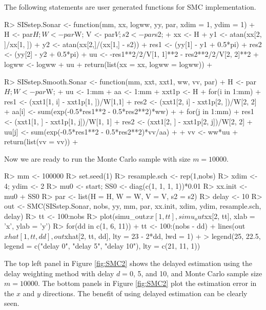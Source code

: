 The following statements are user generated functions for SMC implementation.
\begin{example}
R> SISstep.Sonar <- function(mm, xx, logww, yy, par, xdim = 1, ydim = 1){
+    H <- par$H; W <- par$W; V <- par$V; s2 <- par$s2;
+    xx <- H%
+    y1 <- atan(xx[2, ]/xx[1, ])
+    y2 <- atan(xx[2,]/(xx[1,] - s2))   
+    res1 <- (yy[1] - y1 + 0.5*pi)%
+    res2 <- (yy[2] - y2 + 0.5*pi)%
+    uu <- -res1**2/2/V[1, 1]**2 - res2**2/2/V[2, 2]**2
+    logww <- logww + uu
+    return(list(xx = xx, logww = logww))
+  }

R> SISstep.Smooth.Sonar <- function(mm, xxt, xxt1, ww, vv, par){
+    H <- par$H; W <- par$W;
+    uu <- 1:mm
+    aa <- 1:mm
+    xxt1p <- H%
+    for(i in 1:mm){
+      res1 <- (xxt1[1, i] - xxt1p[1, ])/W[1,1]
+      res2 <- (xxt1[2, i] - xxt1p[2, ])/W[2, 2]
+      aa[i] <- sum(exp(-0.5*res1**2 - 0.5*res2**2)*ww)
+    }
+    for(j in 1:mm){
+      res1 <- (xxt1[1, ] - xxt1p[1, j])/W[1, 1]
+      res2 <- (xxt1[2, ] - xxt1p[2, j])/W[2, 2]
+      uu[j] <- sum(exp(-0.5*res1**2 - 0.5*res2**2)*vv/aa)
+    }
+    vv <- ww*uu
+    return(list(vv = vv))
+ }
\end{example}

Now we are ready to run the Monte Carlo sample with size $m=10000$. 
\begin{example}
R> mm <- 100000
R> set.seed(1)
R> resample.sch <- rep(1,nobs)
R> xdim <- 4; ydim <- 2
R> mu0 <- start; SS0 <- diag(c(1, 1, 1, 1))*0.01
R> xx.init <- mu0 + SS0%
R> par <- list(H = H, W = W, V = V, s2 = s2)
R> delay <- 10
R> out <- SMC(SISstep.Sonar, nobs, yy, mm, par, xx.init, xdim, ydim, resample.sch, delay)
R> tt <- 100:nobs
R> plot(simu_out$xx[1, tt], simu_out$xx[2, tt], xlab = 'x', ylab = 'y')
R> for(dd in c(1, 6, 11)){
+      tt <- 100:(nobs - dd)
+      lines(out$xhat[1, tt, dd], out$xhat[2, tt, dd], lty = 23 - 2*dd, lwd = 1)
+    }
> legend(25, 22.5, legend = c("delay 0", "delay 5", "delay 10"), lty = c(21, 11, 1))
\end{example}


The top left panel in Figure \ref{fig:SMC2} shows the delayed estimation using the delay weighting method with delay $d=0$, 5, and 10, and Monte Carlo sample size $m=10000$. The bottom panels in Figure \ref{fig:SMC2} plot the estimation error in the $x$ and $y$ directions. The benefit of using delayed estimation can be clearly seen. 

